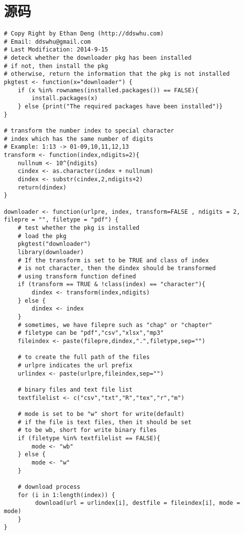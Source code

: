 \documentclass{article}
\begin{document}
\section{源码}
\begin{lstlisting}
# Copy Right by Ethan Deng (http://ddswhu.com)
# Email: ddswhu@gmail.com
# Last Modification: 2014-9-15
# deteck whether the downloader pkg has been installed
# if not, then install the pkg
# otherwise, return the information that the pkg is not installed
pkgtest <- function(x="downloader") {
    if (x %in% rownames(installed.packages()) == FALSE){
        install.packages(x)
    } else {print("The required packages have been installed")}
}

# transform the number index to special character
# index which has the same number of digits
# Example: 1:13 -> 01-09,10,11,12,13
transform <- function(index,ndigits=2){
    nullnum <- 10^{ndigits}
    cindex <- as.character(index + nullnum)
    dindex <- substr(cindex,2,ndigits+2)
    return(dindex)
}

downloader <- function(urlpre, index, transform=FALSE , ndigits = 2, filepre = "", filetype = "pdf") {
    # test whether the pkg is installed
    # load the pkg
    pkgtest("downloader")
    library(downloader)
    # If the transform is set to be TRUE and class of index
    # is not character, then the dindex should be transformed
    # using transform function defined
    if (transform == TRUE & !class(index) == "character"){
        dindex <- transform(index,ndigits)
    } else {
        dindex <- index
    }
    # sometimes, we have filepre such as "chap" or "chapter"
    # filetype can be "pdf","csv","xlsx","mp3"
    fileindex <- paste(filepre,dindex,".",filetype,sep="")

    # to create the full path of the files
    # urlpre indicates the url prefix
    urlindex <- paste(urlpre,fileindex,sep="")

    # binary files and text file list
    textfilelist <- c("csv","txt","R","tex","r","m")

    # mode is set to be "w" short for write(default)
    # if the file is text files, then it should be set
    # to be wb, short for write binary files
    if (filetype %in% textfilelist == FALSE){
        mode <- "wb"
    } else {
        mode <- "w"
    }

    # download process
    for (i in 1:length(index)) {
         download(url = urlindex[i], destfile = fileindex[i], mode = mode)
    }
}


\end{lstlisting}
\end{document}

